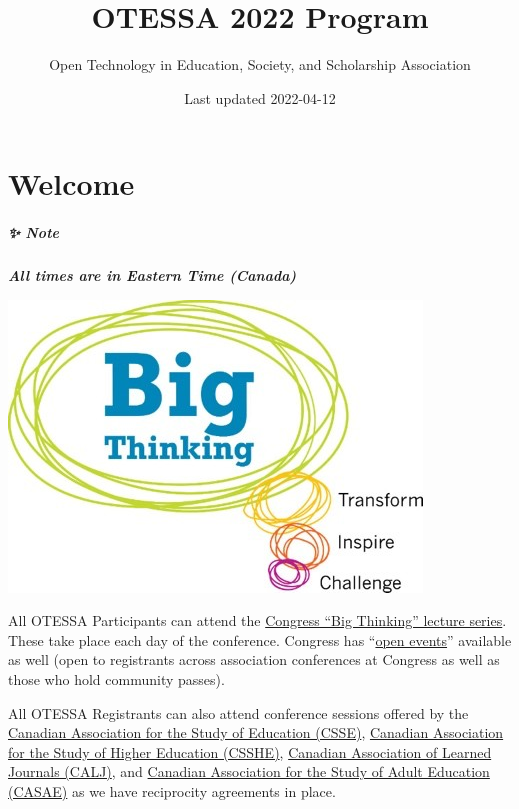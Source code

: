 \documentclass[
]{book}
\title{OTESSA 2022 Program}
\author{Open Technology in Education, Society, and Scholarship Association}
\date{Last updated 2022-04-12}
\begin{document}
\maketitle

{
\setcounter{tocdepth}{1}
\tableofcontents
}
\hypertarget{welcome}{%
\chapter*{Welcome}\label{welcome}}

\begin{protip}
\hypertarget{note}{%
\paragraph*{✨ Note}\label{note}}

\textbf{\emph{All times are in Eastern Time (Canada)}}
\end{protip}

\includegraphics{assets/media/image2.jpeg}

All OTESSA Participants can attend the \href{https://www.federationhss.ca/en/congress/congress-2022/open-programming}{Congress ``Big Thinking'' lecture series}. These take place each day of the conference. Congress has ``\href{https://www.federationhss.ca/en/congress/congress-2022/calendar-open-events}{open events}'' available as well (open to registrants across association conferences at Congress as well as those who hold community passes).

All OTESSA Registrants can also attend conference sessions offered by the \href{https://csse-scee.ca/}{Canadian Association for the Study of Education (CSSE)}, \href{https://csshe-scees.ca/}{Canadian Association for the Study of Higher Education (CSSHE)}, \href{https://www.calj-acrs.ca/}{Canadian Association of Learned Journals (CALJ)}, and \href{https://www.casae-aceea.ca/}{Canadian Association for the Study of Adult Education (CASAE)} as we have reciprocity agreements in place.
\end{document}
